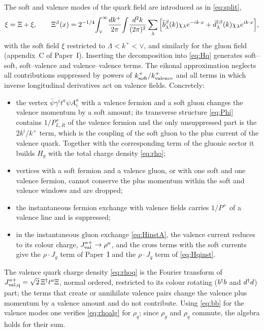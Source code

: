 The soft and valence modes of the quark field are introduced as in \eqref{eq:split},
\begin{equation}
\xi=\Xi+\xi,\qquad
\Xi^{\beta}(x)=2^{-1/4}\!\int_{\vee}^{\infty}\!\frac{dk^{+}}{2\pi}\!\int\!\frac{d^{2}k}{(2\pi)^{2}}
\sum_{\lambda}\Big[\bar b^{\beta}_{\lambda}(k)\chi_{\lambda}e^{-ik\cdot x}+\bar d^{\dagger\beta}_{\lambda}(k)\chi_{\lambda}e^{ik\cdot x}\Big],
\end{equation}
with the soft field $\xi$ restricted to $\Lambda<k^{+}<\vee$, and similarly for the gluon field
(appendix~C of Paper~I). Inserting the decomposition into \eqref{eq:Hq} generates soft--soft,
soft--valence and valence--valence terms. The eikonal approximation neglects all contributions
suppressed by powers of $k^{+}_{\rm soft}/k^{+}_{\rm valence}$ and all terms in which inverse longitudinal
derivatives act on valence fields. Concretely:
\begin{itemize}
\item the vertex $\bar\psi\gamma^{i}t^{a}\psi A^{a}_{i}$ with a valence fermion and a soft gluon changes
the valence momentum by a soft amount; its transverse structure \eqref{eq:Phi} contains
$1/P^{+}_{L,R}$ of the valence fermion and the only unsuppressed part is the $2k^{i}/k^{+}$ term,
which is the coupling of the soft gluon to the plus current of the valence quark. Together with the
corresponding term of the gluonic sector it builds $H_{g}$ with the total charge density
\eqref{eq:rho};
\item vertices with a soft fermion and a valence gluon, or with one soft and one valence fermion, cannot
conserve the plus momentum within the soft and valence windows and are dropped;
\item the instantaneous fermion exchange with valence fields carries $1/P^{+}$ of a valence line and is
suppressed;
\item in the instantaneous gluon exchange \eqref{eq:HinstA}, the valence current reduces to its colour
charge, $J^{a+}_{\rm val}\to\rho^{a}$, and the cross terms with the soft currents give the
$\rho\cdot J_{g}$ term of Paper~I and the $\rho\cdot J_{q}$ term of \eqref{eq:Hqinst}.
\end{itemize}
The valence quark charge density \eqref{eq:rhoq} is the Fourier transform of
$J^{a+}_{\rm val,q}=\sqrt2\,\Xi^{\dagger}t^{a}\Xi$, normal ordered, restricted to its colour rotating
($b^{\dagger}b$ and $d^{\dagger}d$) part; the terms that create or annihilate valence pairs change the valence
plus momentum by a valence amount and do not contribute. Using \eqref{eq:bb} for the valence modes
one verifies \eqref{eq:rhoalg} for $\rho_{q}$; since $\rho_{g}$ and $\rho_{q}$ commute, the algebra holds for
their sum.

